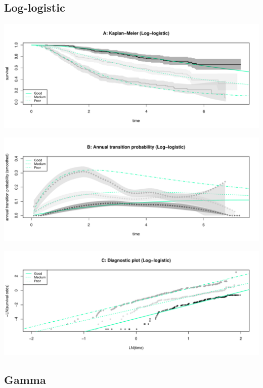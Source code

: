\documentclass[]{article}
\begin{document}
\subsection{Log-logistic}\label{log-logistic}

\begin{flushleft}\includegraphics[height=0.25\textheight]{Images/llog-1} \end{flushleft}

\begin{flushleft}\includegraphics[height=0.25\textheight]{Images/llog-2} \end{flushleft}

\begin{flushleft}\includegraphics[height=0.25\textheight]{Images/llog-3} \end{flushleft}

\newpage 

\subsection{Gamma}\label{gamma}
\end{document}
